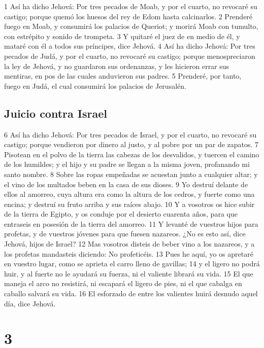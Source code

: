 1 Así ha dicho Jehová: Por tres pecados de Moab, y por el cuarto, no revocaré su castigo; porque quemó los huesos del rey de Edom hasta calcinarlos.
2 Prenderé fuego en Moab, y consumirá los palacios de Queriot; y morirá Moab con tumulto, con estrépito y sonido de trompeta.
3 Y quitaré el juez de en medio de él, y mataré con él a todos sus príncipes, dice Jehová.
4 Así ha dicho Jehová: Por tres pecados de Judá, y por el cuarto, no revocaré su castigo; porque menospreciaron la ley de Jehová, y no guardaron sus ordenanzas, y les hicieron errar sus mentiras, en pos de las cuales anduvieron sus padres.
5 Prenderé, por tanto, fuego en Judá, el cual consumirá los palacios de Jerusalén.

\section*{Juicio contra Israel}

6 Así ha dicho Jehová: Por tres pecados de Israel, y por el cuarto, no revocaré su castigo; porque vendieron por dinero al justo, y al pobre por un par de zapatos.
7 Pisotean en el polvo de la tierra las cabezas de los desvalidos, y tuercen el camino de los humildes; y el hijo y su padre se llegan a la misma joven, profanando mi santo nombre.
8 Sobre las ropas empeñadas se acuestan junto a cualquier altar; y el vino de los multados beben en la casa de sus dioses.
9 Yo destruí delante de ellos al amorreo, cuya altura era como la altura de los cedros, y fuerte como una encina; y destruí su fruto arriba y sus raíces abajo.
10 Y a vosotros os hice subir de la tierra de Egipto, y os conduje por el desierto cuarenta años, para que entraseis en posesión de la tierra del amorreo.
11 Y levanté de vuestros hijos para profetas, y de vuestros jóvenes para que fuesen nazareos. ¿No es esto así, dice Jehová, hijos de Israel?
12 Mas vosotros disteis de beber vino a los nazareos, y a los profetas mandasteis diciendo: No profeticéis.
13 Pues he aquí, yo os apretaré en vuestro lugar, como se aprieta el carro lleno de gavillas;
14 y el ligero no podrá huir, y al fuerte no le ayudará su fuerza, ni el valiente librará su vida.
15 El que maneja el arco no resistirá, ni escapará el ligero de pies, ni el que cabalga en caballo salvará su vida.
16 El esforzado de entre los valientes huirá desnudo aquel día, dice Jehová.

\chapter{3}

